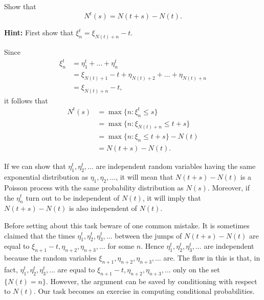 \begin{Exercise}
\label{ex:n-t-equals-difference}
Show that
\begin{equation}
N^t(s) = N(t + s) - N(t).
\label{eq:n-t-equals-difference}
\end{equation}

\noindent\textbf{Hint:} First show that $\xi_n^t = \xi_{N(t)+n} - t$.
\end{Exercise}

\begin{Solution}
Since
\begin{equation}
\begin{aligned}
\xi_n^t &= \eta_1^t + \dots + \eta_n^t \\
&= \xi_{N(t)+1} - t + \eta_{N(t)+2} + \dots + \eta_{N(t)+n} \\
&= \xi_{N(t)+n} - t,
\end{aligned}
\end{equation}
it follows that
\begin{equation}
\begin{aligned}
N^t(s) &= \max\{n: \xi_n^t \leq s\} \\
&= \max\{n: \xi_{N(t)+n} \leq t + s\} \\
&= \max\{n: \xi_n \leq t + s\} - N(t) \\
&= N(t + s) - N(t).
\end{aligned}
\end{equation}
\end{Solution}

If we can show that $\eta_1^t, \eta_2^t, \ldots$ are independent random variables having the same exponential distribution as $\eta_1, \eta_2, \ldots$, it will mean that $N(t + s) - N(t)$ is a Poisson process with the same probability distribution as $N(s)$. Moreover, if the $\eta_n^t$ turn out to be independent of $N(t)$, it will imply that $N(t + s) - N(t)$ is also independent of $N(t)$.

Before setting about this task beware of one common mistake. It is sometimes claimed that the times $\eta_1^t, \eta_2^t, \eta_3^t, \ldots$ between the jumps of $N(t + s) - N(t)$ are equal to $\xi_{n+1} - t, \eta_{n+2}, \eta_{n+3}, \ldots$ for some $n$. Hence $\eta_1^t, \eta_2^t, \eta_3^t, \ldots$ are independent because the random variables $\xi_{n+1}, \eta_{n+2}, \eta_{n+3}, \ldots$ are. The flaw in this is that, in fact, $\eta_1^t, \eta_2^t, \eta_3^t, \ldots$ are equal to $\xi_{n+1} - t, \eta_{n+2}, \eta_{n+3}, \ldots$ only on the set $\{N(t) = n\}$. However, the argument can be saved by conditioning with respect to $N(t)$. Our task becomes an exercise in computing conditional probabilities.

